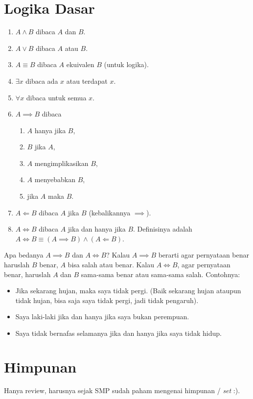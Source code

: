 \section{Logika Dasar}
\begin{enumerate}
    \item $A \land B$ dibaca $A$ dan $B$.
    \item $A \lor B$ dibaca $A$ atau $B$.
    \item $A \equiv B$ dibaca $A$ ekuivalen $B$ (untuk logika).
    \item $\exists x$ dibaca ada $x$ atau terdapat $x$.
    \item $\forall x$ dibaca untuk semua $x$.
    \item $A \implies B$ dibaca
    \begin{enumerate}
        \item $A$ hanya jika $B$,
        \item $B$ jika $A$,
        \item $A$ mengimplikasikan $B$,
        \item $A$ menyebabkan $B$,
        \item jika $A$ maka $B$.
    \end{enumerate}
    \item $A \Longleftarrow B$ dibaca $A$ jika $B$ (kebalikannya $\implies$).
    \item $A \iff B$ dibaca $A$ jika dan hanya jika $B$. Definisinya adalah $A \iff B \equiv (A \implies B) \land (A \Longleftarrow B)$.
\end{enumerate}
Apa bedanya $A \implies B$ dan $A \iff B$? Kalau $A \implies B$ berarti agar pernyataan benar haruslah $B$ benar, $A$ bisa salah atau benar. Kalau $A \iff B$, agar pernyataan benar, haruslah $A$ dan $B$ sama-sama benar atau sama-sama salah. Contohnya:
\begin{itemize}
    \item Jika sekarang hujan, maka saya tidak pergi. (Baik sekarang hujan ataupun tidak hujan, bisa saja saya tidak pergi, jadi tidak pengaruh).
    \item Saya laki-laki jika dan hanya jika saya bukan perempuan.
        \item Saya tidak bernafas selamanya jika dan hanya jika saya tidak hidup.
\end{itemize}
\section{Himpunan}
Hanya review, harusnya sejak SMP sudah paham mengenai himpunan / \textit{set} :).

